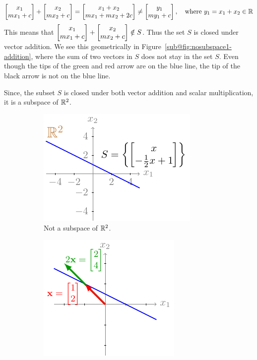 \begin{example}
\begin{enumerate}
        \[ \bmxc x_1 \\ m x_1 + c\emx + \bmxc x_2 \\ m x_2 + c\emx = \bmxc x_1 + x_2 \\ m x_1 + m x_2 + 2c \emx \neq \bmxc y_1 \\ m y_1 + c\emx, \quad \text{where} \,\, y_1 = x_1 + x_2 \in \mb{R} \]
        This means that $\bmxc x_1 \\ m x_1 + c\emx + \bmxc x_2 \\ m x_2 + c\emx \notin S$. Thus the set $S$ is closed under vector addition. We see this geometrically in Figure~\ref{sub@fig:nosubspace1-addition}, where the sum of two vectors in $S$ does not stay in the set $S$. Even though the tips of the green and red arrow are on the blue line, the tip of the black arrow is not on the blue line.
    \end{enumerate}
    Since, the subset $S$ is closed under both vector addition and scalar multiplication, it is a subspace of $\mathbb{R}^2$.
    \begin{figure}[h]
        \centering
        \begin{subfigure}[b]{0.32\textwidth}
            \includegraphics{figure/chapter01/nosubspace1(a).pdf}
            \caption{Not a subspace of $\mathbb{R}^2$.}
            \label{fig:nosubspace1}
        \end{subfigure}
        \begin{subfigure}[b]{0.32\textwidth}
            \centering
            \includegraphics{figure/chapter01/nosubspace1(b).pdf}

\end{subfigure}
\end{figure}
\end{example}
